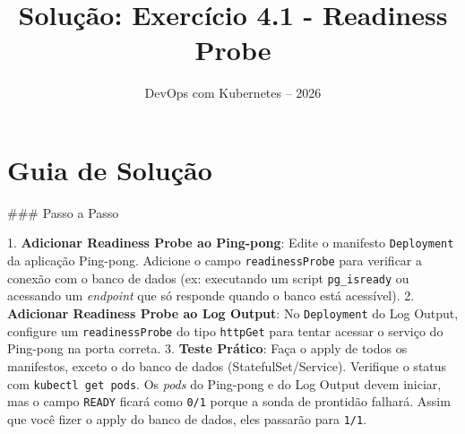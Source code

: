 \documentclass[11pt,a4paper]{article}
\title{\color{secondary}\Huge\textbf{Solução: Exercício 4.1 - Readiness Probe}}
\author{\color{primary}DevOps com Kubernetes -- 2026}
\date{}
\begin{document}
\maketitle

\section*{\color{primary}Guia de Solução}
\begin{tcolorbox}[colback=green!5!white,colframe=green!60!black,title=Resolução Passo a Passo]
### Passo a Passo

1. \textbf{Adicionar Readiness Probe ao Ping-pong}: Edite o manifesto \texttt{Deployment} da aplicação Ping-pong. Adicione o campo \texttt{readinessProbe} para verificar a conexão com o banco de dados (ex: executando um script \texttt{pg_isready} ou acessando um \textit{endpoint} que só responde quando o banco está acessível).
2. \textbf{Adicionar Readiness Probe ao Log Output}: No \texttt{Deployment} do Log Output, configure um \texttt{readinessProbe} do tipo \texttt{httpGet} para tentar acessar o serviço do Ping-pong na porta correta.
3. \textbf{Teste Prático}: Faça o apply de todos os manifestos, exceto o do banco de dados (StatefulSet/Service). Verifique o status com \texttt{kubectl get pods}. Os \textit{pods} do Ping-pong e do Log Output devem iniciar, mas o campo \texttt{READY} ficará como \texttt{0/1} porque a sonda de prontidão falhará. Assim que você fizer o apply do banco de dados, eles passarão para \texttt{1/1}.
\end{tcolorbox}
\end{document}
